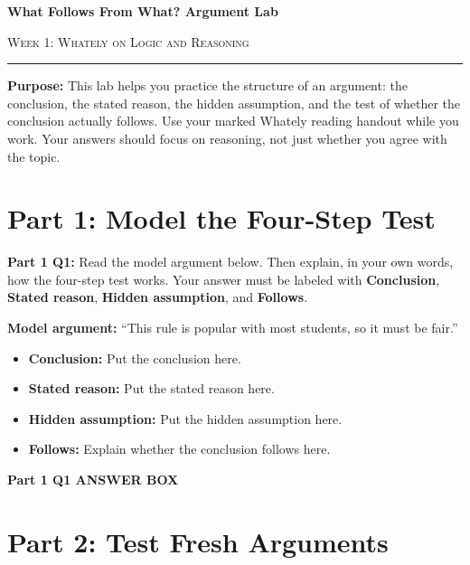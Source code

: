\documentclass[12pt]{article}
\newcommand{\answerbox}[2]{%
\vspace{0.15em}
\noindent\textbf{#1}\par
\vspace{0.05em}
\noindent\fbox{%
\begin{minipage}[t][#2]{\dimexpr\textwidth-2\fboxsep-2\fboxrule}
\rule{\textwidth}{0pt}
\vspace{#2}
\end{minipage}
}\par
\vspace{0.25em}
}
\begin{document}
\begin{center}
{\LARGE\bfseries What Follows From What? Argument Lab}\par\vspace{0.05em}
{\large\scshape Week 1: Whately on Logic and Reasoning}\par\vspace{0.1em}
\rule{0.78\textwidth}{0.5pt}\par\vspace{0.15em}
\end{center}

\noindent\textbf{Purpose:} This lab helps you practice the structure of an argument: the conclusion, the stated reason, the hidden assumption, and the test of whether the conclusion actually follows. Use your marked Whately reading handout while you work. Your answers should focus on reasoning, not just whether you agree with the topic.

\vspace{0.3em}

\section*{Part 1: Model the Four-Step Test}

\textbf{Part 1 Q1:} Read the model argument below. Then explain, in your own words, how the four-step test works. Your answer must be labeled with \textbf{Conclusion}, \textbf{Stated reason}, \textbf{Hidden assumption}, and \textbf{Follows}.

\vspace{0.15em}
\noindent\textbf{Model argument:} ``This rule is popular with most students, so it must be fair.''

\begin{itemize}[leftmargin=*, itemsep=0.08em, topsep=0.08em, parsep=0pt]
\item \textbf{Conclusion:} Put the conclusion here.
\item \textbf{Stated reason:} Put the stated reason here.
\item \textbf{Hidden assumption:} Put the hidden assumption here.
\item \textbf{Follows:} Explain whether the conclusion follows here.
\end{itemize}

\answerbox{Part 1 Q1 ANSWER BOX}{2.25in}

\newpage

\section*{Part 2: Test Fresh Arguments}
\end{document}
